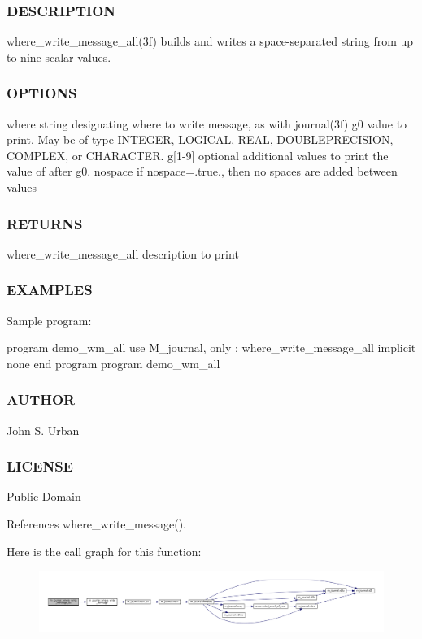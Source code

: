 \subsubsection*{D\+E\+S\+C\+R\+I\+P\+T\+I\+ON}

where\+\_\+write\+\_\+message\+\_\+all(3f) builds and writes a space-\/separated string from up to nine scalar values.

\subsubsection*{O\+P\+T\+I\+O\+NS}

\begin{DoxyVerb}where    string designating where to write message, as with journal(3f)
g0       value to print. May
         be of type INTEGER, LOGICAL, REAL, DOUBLEPRECISION, COMPLEX,
         or CHARACTER.
g[1-9]   optional additional values to print the value of after g0.
nospace  if nospace=.true., then no spaces are added between values
\end{DoxyVerb}
 \subsubsection*{R\+E\+T\+U\+R\+NS}

where\+\_\+write\+\_\+message\+\_\+all description to print

\subsubsection*{E\+X\+A\+M\+P\+L\+ES}

Sample program\+:

program demo\+\_\+wm\+\_\+all use M\+\_\+journal, only \+: where\+\_\+write\+\_\+message\+\_\+all implicit none end program program demo\+\_\+wm\+\_\+all \subsubsection*{A\+U\+T\+H\+OR}

John S. Urban \subsubsection*{L\+I\+C\+E\+N\+SE}

Public Domain 

References where\+\_\+write\+\_\+message().

Here is the call graph for this function\+:\nopagebreak
\begin{figure}[H]
\begin{center}
\leavevmode
\includegraphics[width=350pt]{namespacem__journal_a25d0f5da7f7e84e22ab0a583447412b1_cgraph}
\end{center}
\end{figure}
\mbox{\label{namespacem__journal_a1ee1cbb181ac428b54cd9e7acaba3be9}} 
